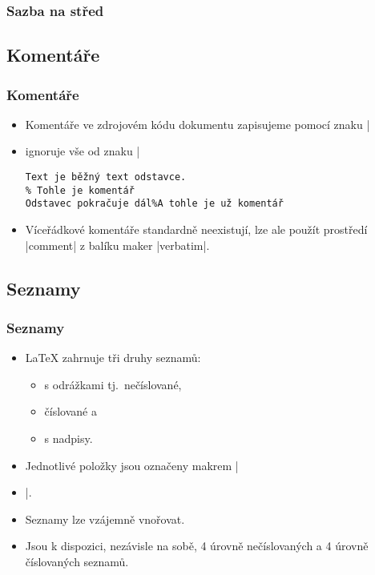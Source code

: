 \begin{frame}
	\frametitle{Sazba na střed}
	\centering
	\bigskip
\end{frame}


\subsection{Komentáře}
\begin{frame}[fragile]
	\frametitle{Komentáře}
	\begin{itemize}
		\item Komentáře ve zdrojovém kódu dokumentu zapisujeme pomocí znaku |%
		\item {} ignoruje vše od znaku |%
			\begin{Verbatim}
Text je běžný text odstavce.
% Tohle je komentář
Odstavec pokračuje dál%A tohle je už komentář
			\end{Verbatim}
		\item Víceřádkové komentáře standardně neexistují, lze ale použít prostředí |comment| z balíku maker |verbatim|.
	\end{itemize}
\end{frame}


\subsection{Seznamy}
\begin{frame}[fragile]
	\frametitle{Seznamy}
	\begin{itemize}
		\item \LaTeX{} zahrnuje tři druhy seznamů:
			\begin{itemize}
				\item s odrážkami tj.\ nečíslované,
				\item číslované a
				\item s nadpisy.
			\end{itemize}
		\item Jednotlivé položky jsou označeny makrem |\item|.
		\item Seznamy lze vzájemně vnořovat.\par
		\item Jsou k dispozici, nezávisle na sobě, 4 úrovně nečíslovaných a 4 úrovně číslovaných seznamů.
	\end{itemize}
\end{frame}


